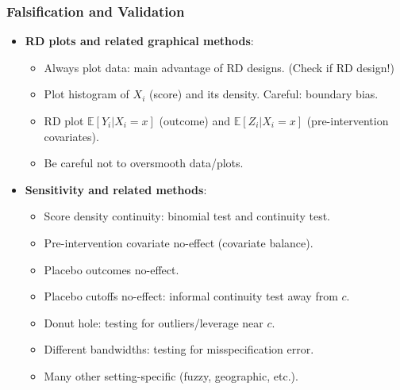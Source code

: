 \documentclass[9pt]{beamer}
\newcommand{\E}{\mathbb{E}}
\renewcommand{\c}{c}
\begin{document}
\begin{frame}\frametitle{Falsification and Validation}
	\begin{itemize}
		\item \textbf{RD plots and related graphical methods}:\medskip		
		\begin{itemize}
			\item Always plot data: main advantage of RD designs. (Check if RD design!)\medskip	
			\item Plot histogram of $X_{i}$ (score) and its density. Careful: boundary bias.\medskip
			\item RD plot $\E[Y_{i}|X_{i}=x]$ (outcome) and $\E[Z_{i}|X_{i}=x]$ (pre-intervention covariates).\medskip
			\item Be careful not to oversmooth data/plots.\bigskip
		\end{itemize}
		
		\item \textbf{Sensitivity and related methods}:\medskip
		\begin{itemize}
			\item Score density continuity: binomial test and continuity test.\medskip
			\item Pre-intervention covariate no-effect (covariate balance).\medskip
			\item Placebo outcomes no-effect.\medskip
			\item Placebo cutoffs no-effect: informal continuity test away from $\c$.\medskip
			\item Donut hole: testing for outliers/leverage near $\c$.\medskip
			\item Different bandwidths: testing for misspecification error.\medskip
			\item Many other setting-specific (fuzzy, geographic, etc.).
		\end{itemize}
	\end{itemize}
\end{frame}
\end{document}
